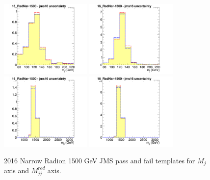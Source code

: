 \begin{figure}[!htb]
	\centering
	\includegraphics[width=0.4\textwidth]{Figures/Uncertainty_16_RadNar-1500_jms16failX.png}
	\includegraphics[width=0.4\textwidth]{Figures/Uncertainty_16_RadNar-1500_jms16passX.png}
	\includegraphics[width=0.4\textwidth]{Figures/Uncertainty_16_RadNar-1500_jms16failY.png}
	\includegraphics[width=0.4\textwidth]{Figures/Uncertainty_16_RadNar-1500_jms16passY.png}
	\caption{2016 Narrow Radion 1500 GeV JMS pass and fail templates for $M_j$ axis and $M_{jj}^{red}$ axis.}
	\label{fig:jesRadionAppend}
\end{figure}
